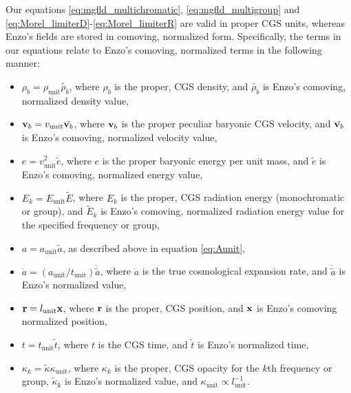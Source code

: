 \documentclass[10pt]{article}
\renewcommand{\(}{\left(}
\renewcommand{\)}{\right)}
\newcommand{\vb}{{\bf v}_b}
\newcommand{\xvec}{{\bf x}}
\newcommand{\rvec}{{\bf r}}
\newcommand{\adot}{\dot{a}}
\newcommand{\rhob}{\rho_b}
\newcommand{\Aunit}{a_{\text{unit}}}
\newcommand{\Lunit}{l_{\text{unit}}}
\newcommand{\Dunit}{\rho_{\text{unit}}}
\newcommand{\Tunit}{t_{\text{unit}}}
\newcommand{\Vunit}{v_{\text{unit}}}
\newcommand{\Eunit}{E_{\text{unit}}}
\newcommand{\Kunit}{\kappa_{\text{unit}}}
\newcommand{\tK}{\tilde{\kappa}}
\newcommand{\tT}{\tilde{t}}
\newcommand{\tE}{\tilde{E}}
\newcommand{\tRho}{\tilde{\rhob}}
\newcommand{\tA}{\tilde{a}}
\begin{document}
Our equations \eqref{eq:mgfld_multichromatic},
\eqref{eq:mgfld_multigroup} and
\eqref{eq:Morel_limiterD}-\eqref{eq:Morel_limiterR} are valid in
proper CGS units, whereas Enzo's fields are stored in comoving,
normalized form.  Specifically, the terms in our equations relate to
Enzo's comoving, normalized terms in the following manner: 
\begin{itemize}
\item $\rhob = \Dunit \tRho$, where $\rhob$ is the proper, CGS
  density, and $\tRho$ is Enzo's comoving, normalized
  density value,
\item $\vb = \Vunit \tilde{\vb}$, where $\vb$ is the proper peculiar
  baryonic CGS velocity, and $\tilde{\vb}$ is Enzo's comoving,
  normalized velocity value,
\item $e = \Vunit^2 \tilde{e}$, where $e$ is the proper
  baryonic energy per unit mass, and $\tilde{e}$ is Enzo's comoving,
  normalized energy value,
\item $E_k = \Eunit \tE$, where $E_k$ is the proper, CGS radiation
  energy (monochromatic or group), and $\tE_k$ is Enzo's comoving,
  normalized radiation energy value for the specified frequency or
  group,
\item $a = \Aunit \tA$, as described above in equation
  \eqref{eq:Aunit},
\item $\adot = \left(\Aunit/\Tunit\right) \dot{\tA}$, where $\adot$ is
  the true cosmological expansion rate, and $\dot{\tA}$ is Enzo's
  normalized value,
\item $\rvec = \Lunit \xvec$, where $\rvec$ is the
  proper, CGS position, and $\xvec$ is Enzo's comoving normalized position,
\item $t = \Tunit \tT$, where $t$ is the CGS time, and $\tT$ is Enzo's
  normalized time,
\item $\kappa_k = \tK \Kunit$, where $\kappa_k$ is the proper, CGS
  opacity for the $k$th frequency or group, $\tK_k$ is Enzo's
  normalized value, and $\Kunit \propto \Lunit^{-1}$.
\end{itemize}
\end{document}
